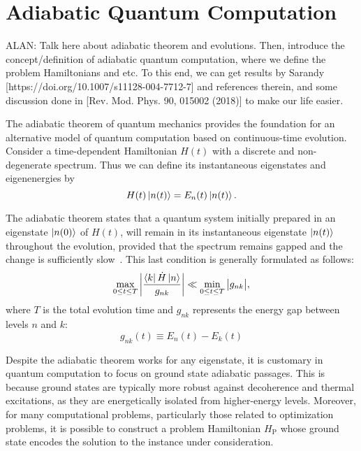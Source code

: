\section{Adiabatic Quantum Computation}
\label{Section:AQC}
{\color{blue}ALAN: Talk here about adiabatic theorem and evolutions. Then, introduce the concept/definition of
adiabatic quantum computation, where we define the problem Hamiltonians and etc. To this end,
we can get results by Sarandy [https://doi.org/10.1007/s11128-004-7712-7] and references therein,
and some discussion done in [Rev. Mod. Phys. 90, 015002 (2018)] to make our life easier.}

The adiabatic theorem of quantum mechanics provides the foundation for an alternative model
of quantum computation based on continuous-time evolution. Consider a time-dependent Hamiltonian
$H(t)$ with a discrete and non-degenerate spectrum. Thus we can define its instantaneous
eigenstates and eigenenergies by
\begin{equation}
    H(t) \ket{n(t)} = E_n (t) \ket{n(t)}.
    \label{eq:instantaneous_eigenstates}
\end{equation}

\noindent The adiabatic theorem states that a quantum system initially prepared in an eigenstate
$\ket{n(0)}$ of  $H(t)$, will remain in its instantaneous eigenstate $\ket{n(t)}$ throughout
the evolution, provided that the spectrum remains gapped and the change is sufficiently
slow~\cite{sarandy_consistency_2004,albash_adiabatic_2018}. This last condition is generally formulated as follows:
\begin{equation}
    \max_{0 \leq t \leq T} \bigg| \dfrac{\bra{k} \dot{H} \ket{n}}{g_{nk}} \bigg| \ll \min_{0 \leq t \leq T} \big| g_{nk} \big|,
    \label{eq:adiabatic_condition}
\end{equation}
where $T$ is the total evolution time and $g_{nk}$ represents the energy gap between levels $n$ and $k$: 
\begin{equation}
    g_{nk}(t) \equiv E_n(t) - E_k(t)
    \label{eq:energy_gap}
\end{equation}

Despite the adiabatic theorem works for any eigenstate, it is customary in quantum computation to focus on
ground state adiabatic passages. This is because ground states are typically more robust against
decoherence and thermal excitations, as they are energetically isolated from higher-energy levels.
Moreover, for many computational problems, particularly those related to optimization problems,
it is possible to construct a problem Hamiltonian $H_\mathrm{P}$ whose ground state encodes
the solution to the instance under consideration.

